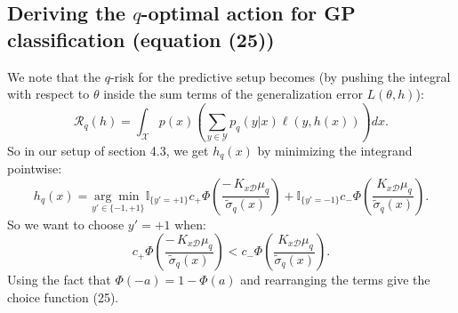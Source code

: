 \documentclass{article}
\newcommand{\dataset}{\mathcal{D}}
\newcommand{\argmin}[1]{\underset{#1}{\arg\min\:}}
\begin{document}
\subsection{Deriving the $q$-optimal action for GP classification (equation (25))}

We note that the $q$-risk for the predictive setup becomes (by pushing the integral with respect to $\theta$ inside the sum terms of the generalization error $L(\theta,h)$):
$$
    \mathcal{R}_q(h) =  \int_\mathcal{X} p(x) \left( \sum_{y \in \mathcal{Y}} p_q(y|x) \ell(y,h(x)) \right)  dx.
$$
So in our setup of section 4.3, we get $h_q(x)$ by minimizing the integrand pointwise:
$$
    h_q(x) = \argmin{y' \in \{-1,+1\}} \mathbb{I}_{\{y'=+1\}} c_+ \Phi\left( \frac{-\,K_{x\dataset} \mu_q}{\tilde{\sigma}_q(x)} \right) + \mathbb{I}_{\{y'=-1\}} c_-  \Phi\left( \frac{\,K_{x\dataset} \mu_q}{\tilde{\sigma}_q(x)} \right).
$$
So we want to choose $y' = +1$ when:
$$
     c_+ \Phi\left( \frac{-\,K_{x\dataset} \mu_q}{\tilde{\sigma}_q(x)} \right) < c_-  \Phi\left( \frac{\,K_{x\dataset} \mu_q}{\tilde{\sigma}_q(x)} \right).
$$
Using the fact that $\Phi(-a) = 1-\Phi(a)$ and rearranging the terms give the choice function (25).

%
%
\end{document}
